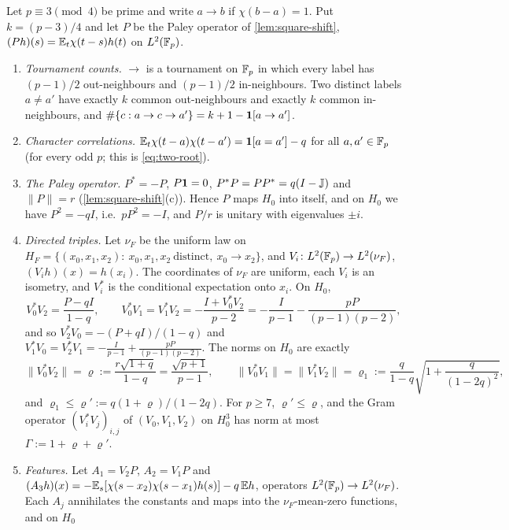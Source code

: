 \begin{lemma}\label{lem:paley-triple}
Let $p\equiv3\pmod4$ be prime and write $a\to b$ if $\chi(b-a)=1$. Put
$k=(p-3)/4$ and let $P$ be the Paley operator of \cref{lem:square-shift},
$(Ph)(s)=\mathbb E_t\chi(t-s)h(t)$ on $L^2(\mathbb F_p)$.
\begin{enumerate}[label=\textup{(\alph*)}]
\item\label{it:paley:counts} \emph{Tournament counts.} $\to$ is a tournament on $\mathbb F_p$
 in which every label has $(p-1)/2$ out-neighbours and $(p-1)/2$
 in-neighbours. Two distinct labels $a\ne a'$ have exactly $k$ common
 out-neighbours and exactly $k$ common in-neighbours, and
 $\#\{c:a\to c\to a'\}=k+1-\mathbf 1[a\to a']$.
\item\label{it:paley:corr} \emph{Character correlations.}
 $\mathbb E_t\chi(t-a)\chi(t-a')=\mathbf 1[a=a']-q$ for all $a,a'\in\mathbb F_p$ (for every odd $p$;
 this is \eqref{eq:two-root}).
\item\label{it:paley:op} \emph{The Paley operator.} $P^*=-P$, $P\mathbf 1=0$,
 $P^*P=PP^*=q(I-\mathbb J)$ and $\|P\|=r$ (\cref{lem:square-shift}(c)). Hence $P$
 maps $H_0$ into itself, and on $H_0$ we have $P^2=-qI$, i.e.\ $pP^2=-I$, and
 $P/r$ is unitary with eigenvalues $\pm i$.
\item\label{it:paley:triples} \emph{Directed triples.} Let $\nu_F$ be the uniform law on
 $H_F=\{(x_0,x_1,x_2):\ x_0,x_1,x_2\ \text{distinct},\ x_0\to x_2\}$, and
 $V_i\colon L^2(\mathbb F_p)\to L^2(\nu_F)$, $(V_ih)(x)=h(x_i)$. The coordinates of
 $\nu_F$ are uniform, each $V_i$ is an isometry, and $V_i^*$ is the conditional
 expectation onto $x_i$. On $H_0$,
 \[
  V_0^*V_2=\frac{P-qI}{1-q},\qquad
  V_0^*V_1=V_1^*V_2=-\frac{I+V_0^*V_2}{p-2}=-\frac I{p-1}-\frac{pP}{(p-1)(p-2)},
 \]
 and so $V_2^*V_0=-(P+qI)/(1-q)$ and
 $V_1^*V_0=V_2^*V_1=-\frac I{p-1}+\frac{pP}{(p-1)(p-2)}$. The norms on $H_0$ are
 exactly
 \[
  \|V_0^*V_2\|=\varrho:=\frac{r\sqrt{1+q}}{1-q}=\frac{\sqrt{p+1}}{p-1},\qquad
  \|V_0^*V_1\|=\|V_1^*V_2\|=\varrho_1:=\frac{q}{1-q}\sqrt{1+\frac q{(1-2q)^2}},
 \]
 and $\varrho_1\le\varrho':=q(1+\varrho)/(1-2q)$. For $p\ge7$, $\varrho'\le\varrho$, and
 the Gram operator $(V_i^*V_j)_{i,j}$ of $(V_0,V_1,V_2)$ on $H_0^3$ has norm at
 most $\Gamma:=1+\varrho+\varrho'$.
\item\label{it:paley:features} \emph{Features.} Let $A_1=V_2P$, $A_2=V_1P$ and
 $(A_3h)(x)=-\mathbb E_s[\chi(s-x_2)\chi(s-x_1)h(s)]-q\,\mathbb E h$, operators
 $L^2(\mathbb F_p)\to L^2(\nu_F)$. Each $A_j$ annihilates the constants and maps into the
 $\nu_F$-mean-zero functions, and on $H_0$
 \begin{gather*}

\end{gather*}
\end{enumerate}
\end{lemma}
